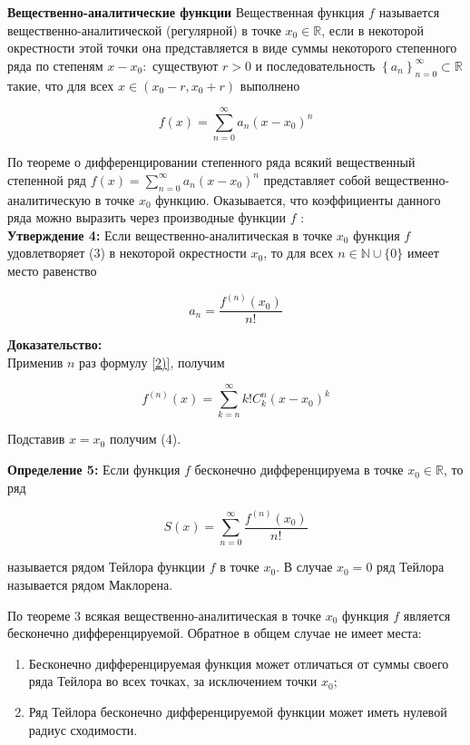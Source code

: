 \documentclass[a4paper,12pt]{article} %
\begin{document}
\textbf{Вещественно-аналитические функции}
Вещественная функция $f$ называется вещественно-аналитической (регулярной) в точке $x_{0} \in \mathbb{R}$, если в некоторой окрестности этой точки она представляется в виде суммы некоторого степенного ряда по степеням $x-x_{0}:$ существуют $r>0$ и последовательность $\left\{a_{n}\right\}_{n=0}^{\infty} \subset \mathbb{R}$ такие, что для всех $x \in\left(x_{0}-r, x_{0}+r\right)$ выполнено

$$
f(x)=\sum_{n=0}^{\infty} a_{n}\left(x-x_{0}\right)^{n}
$$

По теореме о дифференцировании степенного ряда всякий вещественный степенной ряд $f(x)=\sum_{n=0}^{\infty} a_{n}\left(x-x_{0}\right)^{n}$ представляет собой вещественно-аналитическую в точке $x_{0}$ функцию. Оказывается, что коэффициенты данного ряда можно выразить через производные функции $f$ :\\ \textbf{Утверждение 4:} Если вещественно-аналитическая в точке $x_{0}$ функция $f$ удовлетворяет (3) в некоторой окрестности $x_{0}$, то для всех $n \in \mathbb{N} \cup\{0\}$ имеет место равенство

$$
a_{n}=\frac{f^{(n)}\left(x_{0}\right)}{n !}
$$

\textbf{Доказательство:}\\
Применив $n$ раз формулу \eqref{2)}, получим

$$
f^{(n)}(x)=\sum_{k=n}^{\infty} k ! C_{k}^{n}\left(x-x_{0}\right)^{k}
$$

Подставив $x=x_{0}$ получим (4).

\textbf{Определение 5:} Если функция $f$ бесконечно дифференцируема в точке $x_{0} \in \mathbb{R}$, то ряд

$$
S(x)=\sum_{n=0}^{\infty} \frac{f^{(n)}\left(x_{0}\right)}{n !}
$$

называется рядом Тейлора функции $f$ в точке $x_{0}$. В случае $x_{0}=0$ ряд Тейлора называется рядом Маклорена.

По теореме 3 всякая вещественно-аналитическая в точке $x_{0}$ функция $f$ является бесконечно дифференцируемой. Обратное в общем случае не имеет места:

\begin{enumerate}
\item Бесконечно дифференцируемая функция может отличаться от суммы своего ряда Тейлора во всех точках, за исключением точки $x_{0}$;

\item Ряд Тейлора бесконечно дифференцируемой функции может иметь нулевой радиус сходимости.

\end{enumerate}
\end{document}

